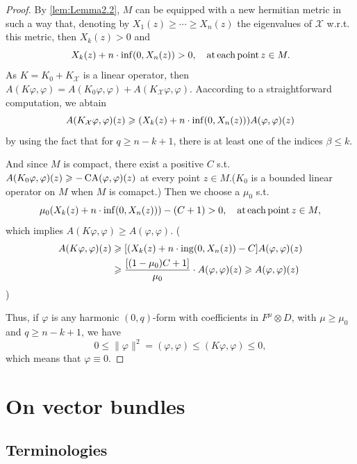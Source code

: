 \documentclass[lang=en,12pt]{beautybook}
\begin{document}
\begin{proof}
  By \autoref{lem:Lemma2.2}, $M$ can be equipped with a new hermitian metric
  in such a way that, denoting by $X_1 (z) \geqslant \cdots \geqslant X_n (z)$
  the eigenvalues of $\mathcal{X}$ w.r.t. this metric, then $X_k (z) > 0$ and
  \[ X_k (z) + n \cdot \inf (0, X_n (z)) > 0, \quad \operatorname{at} \operatorname{each}
    \operatorname{point} z \in M. \]
  As $K = K_0 + K_{\mathcal{X}}$ is a linear operator, then $A (K \varphi,
    \varphi) = A (K_0 \varphi, \varphi) + A (K_{\mathcal{X}} \varphi, \varphi)$.
  Aaccording to a straightforward computation, we abtain
  \[ A (K_{\mathcal{X}} \varphi, \varphi) (z) \geqslant (X_k (z) + n \cdot
    \operatorname{inf} (0, X_n (z))) A (\varphi, \varphi) (z) \]
  by using the fact that for $q \geqslant n - k + 1$, there is at least one
  of the indices $\beta \leqslant k$.

  And since $M$ is compact, there exist a positive $C$ s.t. $A (K_0 \varphi,
    \varphi) (z) \geqslant - \operatorname{CA} (\varphi, \varphi) (z)$ at every point $z
    \in M$.($K_0$ is a bounded linear operator on $M$ when $M$ is comapct.) Then
  we choose a $\mu_0$ s.t.
  \[ \mu_0 (X_k (z) + n \cdot \inf (0, X_n (z))) - (C + 1) > 0, \quad
    \operatorname{at} \operatorname{each} \operatorname{point} z \in M, \]
  which implies $A (K \varphi, \varphi) \geqslant A (\varphi, \varphi)$. (
  \begin{align*}
    A (K \varphi, \varphi) (z) & \geqslant [ (X_k (z) + n \cdot
    \operatorname{ing} (0, X_n (z)) - C] A (\varphi, \varphi) (z)       \\
                               & \geqslant \frac{[(1
          - \mu_0) C + 1]}{\mu_0} \cdot A (\varphi, \varphi) (z) \geqslant A
    (\varphi, \varphi) (z)
  \end{align*}
  )

  Thus, if $\varphi$ is any harmonic $(0, q)$-form with coefficients in
  $F^{\mu} \otimes D$, with $\mu \geqslant \mu_0$ and $q \geqslant n - k + 1$,
  we have
  \[ 0 \leqslant \| \varphi \|^2 = (\varphi, \varphi) \leqslant (K \varphi,
    \varphi) \leqslant 0, \]
  which means that $\varphi \equiv 0$.
\end{proof}

\section{On vector bundles}

\subsection{Terminologies}
\end{document}
